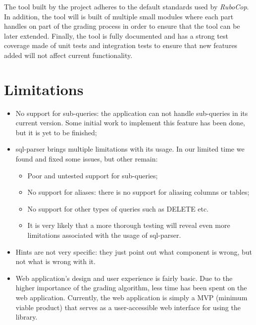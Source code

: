 The tool built by the project adheres to the default standards used by \textit{RuboCop}. In addition, the tool will is built of multiple small modules where each part handles on part of the grading process in order to ensure that the tool can be later extended. Finally, the tool is fully documented and has a strong test coverage made of unit tests and integration tests to ensure that new features added will not affect current functionality.

\section{Limitations}
\begin{itemize}
    \item No support for sub-queries: the application can not handle sub-queries in its current version. Some initial work to implement this feature has been done, but it is yet to be finished;
    \item sql-parser brings multiple limitations with its usage. In our limited time we found and fixed some issues, but other remain:
    \begin{itemize}
        \item Poor and untested support for sub-queries;
        \item No support for aliases: there is no support for aliasing columns or tables;
        \item No support for other types of queries such as DELETE etc.
        \item It is very likely that a more thorough testing will reveal even more limitations associated with the usage of sql-parser.
    \end{itemize}
    \item Hints are not very specific: they just point out what component is wrong, but not what is wrong with it.
    \item Web application's design and user experience is fairly basic. Due to the higher importance of the grading algorithm, less time has been spent on the web application. Currently, the web application is simply a MVP (minimum viable product) that serves as a user-accessible web interface for using the library.
\end{itemize}


